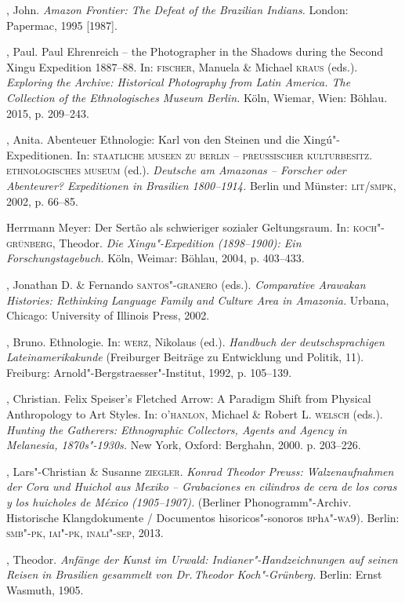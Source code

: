 \begin{bibliohedra}
, John. \textit{Amazon Frontier: The Defeat of the Brazilian
Indians.} London: Papermac, 1995 {[}1987{]}.

, Paul. Paul Ehrenreich -- the Photographer in the Shadows during
the Second Xingu Expedition 1887--88. In: \textsc{fischer}, Manuela \& Michael
\textsc{kraus} (eds.). \textit{Exploring the Archive: Historical Photography from
Latin America. The Collection of the Ethnologisches Museum Berlin.}
Köln, Wiemar, Wien: Böhlau. 2015, p. 209--243.

, Anita. Abenteuer Ethnologie: Karl von den Steinen und
die Xingú"-Expeditionen. In: \textsc{staatliche museen zu berlin -- preussischer
kulturbesitz. ethnologisches museum} (ed.). \textit{Deutsche am Amazonas
-- Forscher oder Abenteurer? Expeditionen in Brasilien 1800--1914.}
Berlin und Münster: \textsc{lit/smpk}, 2002, p. 66--85.

\titidem Herrmann Meyer: Der Sertão als schwieriger sozialer
Geltungsraum. In: \textsc{koch"-grünberg}, Theodor. \textit{Die Xingu"-Expedition
(1898--1900): Ein Forschungstagebuch.} Köln, Weimar: Böhlau, 2004, p.
403--433.

, Jonathan D. \& Fernando \textsc{santos"-granero} (eds.). \textit{Comparative
Arawakan Histories: Rethinking Language Family and Culture Area in
Amazonia.} Urbana, Chicago: University of Illinois Press, 2002.

, Bruno. Ethnologie. In: \textsc{werz}, Nikolaus (ed.). \textit{Handbuch
der deutschsprachigen Lateinamerikakunde} (Freiburger Beiträge zu
Entwicklung und Politik, 11). Freiburg: Arnold"-Bergstraesser"-Institut,
1992, p. 105--139.

, Christian. Felix Speiser's Fletched Arrow: A Paradigm Shift
from Physical Anthropology to Art Styles. In: \textsc{o'hanlon}, Michael \&
Robert L. \textsc{welsch} (eds.). \textit{Hunting the Gatherers: Ethnographic
Collectors, Agents and Agency in Melanesia, 1870s"-1930s.} New York,
Oxford: Berghahn, 2000. p. 203--226.

, Lars"-Christian \& Susanne \textsc{ziegler}. \textit{Konrad Theodor Preuss:
Walzenaufnahmen der Cora und Huichol aus Mexiko -- Grabaciones en
cilindros de cera de los coras y los huicholes de México (1905--1907).}
(Berliner Phonogramm"-Archiv. Historische Klangdokumente / Documentos
hisoricos"-sonoros \textsc{bp}h\textsc{a}"-\textsc{wa}9). Berlin: \textsc{smb"-pk, iai"-pk, inali"-sep}, 2013.

, Theodor. \textit{Anfänge der Kunst im Urwald:
Indianer"-Handzeichnungen auf seinen Reisen in Brasilien gesammelt von
Dr.\,Theodor Koch"-Grünberg.} Berlin: Ernst Wasmuth, 1905.


\end{bibliohedra}
